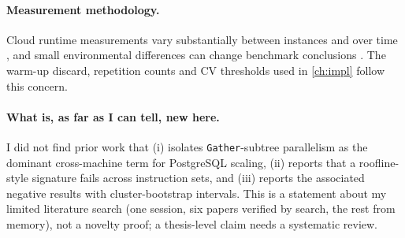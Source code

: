 \paragraph{Measurement methodology.}
Cloud runtime measurements vary substantially between instances and over time
\citep{schad:cloudvariance,leitner:chaos}, and small environmental differences can change benchmark
conclusions \citep{mytkowicz:wrongdata}. The warm-up discard, repetition counts and CV thresholds used in
\cref{ch:impl} follow this concern.

\paragraph{What is, as far as I can tell, new here.}
I did not find prior work that (i) isolates \texttt{Gather}-subtree parallelism as the dominant
cross-machine term for PostgreSQL scaling, (ii) reports that a roofline-style signature fails across
instruction sets, and (iii) reports the associated negative results with cluster-bootstrap intervals. This
is a statement about my limited literature search (one session, six papers verified by search, the rest
from memory), not a novelty proof; a thesis-level claim needs a systematic review.

